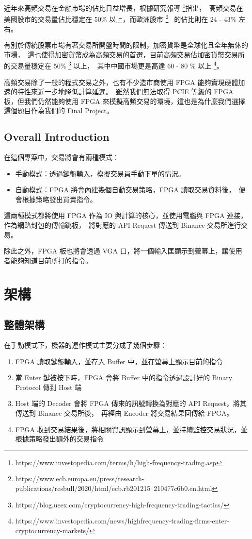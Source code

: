 \documentclass[10.5pt,compsoc,UTF8]{CjC}
\theoremstyle{mystyle}
\begin{document}
近年來高頻交易在金融市場的佔比日益增長，根據研究報導 \footnote{https://www.investopedia.com/terms/h/high-frequency-trading.asp}指出，\
高頻交易在美國股市的交易量佔比穩定在 50\% 以上，而歐洲股市 \footnote{https://www.ecb.europa.eu/press/research-publications/resbull/2020/html/ecb.rb201215~210477c6b0.en.html} \
的佔比則在 24 - 43\% 左右。\

有別於傳統股票市場有著交易所開盤時間的限制，加密貨幣是全球化且全年無休的市場，\
這也使得加密貨幣成為高頻交易的首選，目前高頻交易佔加密貨幣交易所的交易量穩定在 50\% \footnote{https://blog.ueex.com/cryptocurrency-high-frequency-trading-tactics/} 以上，\
其中中國市場更是高達 60 - 80 \% 以上 \footnote{https://www.investopedia.com/news/highfrequency-trading-firms-enter-cryptocurrency-markets/}。

高頻交易除了一般的程式交易之外，也有不少造市商使用 FPGA 能夠實現硬體加速的特性來近一步地降低計算延遲。\
雖然我們無法取得 PCIE 等級的 FPGA 板，但我們仍然能夠使用 FPGA 來模擬高頻交易的環境，這也是為什麼我們選擇這個題目作為我們的 Final Project。

\subsection{Overall Introduction}
在這個專案中，交易將會有兩種模式：
\begin{itemize}
  \item 手動模式：透過鍵盤輸入，模擬交易員手動下單的情況。
  \item 自動模式：FPGA 將會內建幾個自動交易策略，FPGA 讀取交易資料後，\
  便會根據策略發出買賣指令。
\end{itemize}

這兩種模式都將使用 FPGA 作為 IO 與計算的核心，並使用電腦與 FPGA 連接，作為網路封包的傳輸跳板，\
將對應的 API Request 傳送到 Binance 交易所進行交易。

除此之外，FPGA 板也將會透過 VGA 口，將一個輸入匡顯示到螢幕上，讓使用者能夠知道目前所打的指令。

\section{架構}

\subsection{整體架構}

在手動模式下，機器的運作模式主要分成了幾個步驟：
\begin{enumerate}
  \item FPGA 讀取鍵盤輸入，並存入 Buffer 中，並在螢幕上顯示目前的指令
  \item 當 Enter 鍵被按下時，FPGA 會將 Buffer 中的指令透過設計好的 Binary Protocol 傳到 Host 端
  \item Host 端的 Decoder 會將 FPGA 傳來的訊號轉換為對應的 API Request，將其傳送到 Binance 交易所後，\
        再經由 Encoder 將交易結果回傳給 FPGA。
  \item FPGA 收到交易結果後，將相關資訊顯示到螢幕上，並持續監控交易狀況，並根據策略發出額外的交易指令
\end{enumerate}
\end{document}
